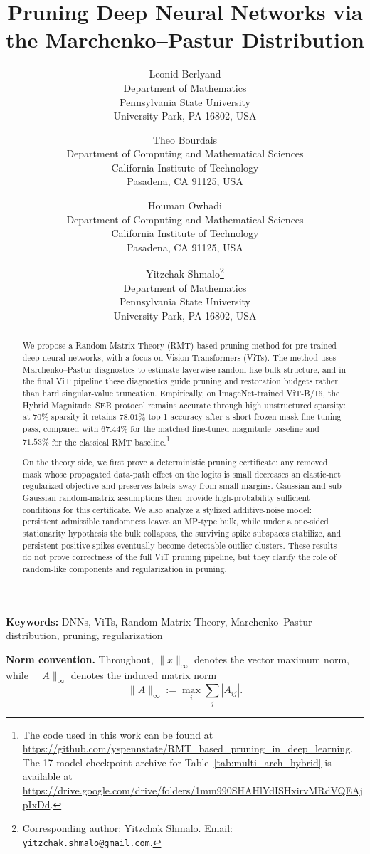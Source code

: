 \documentclass[11pt]{article}
\title{\textbf{Pruning Deep Neural Networks via the Marchenko--Pastur Distribution}}
\author{
    Leonid Berlyand \\
    {\small Department of Mathematics} \\
    {\small Pennsylvania State University} \\
    {\small University Park, PA 16802, USA}
    \and
    Theo Bourdais\\
    {\small Department of Computing and Mathematical Sciences} \\
    {\small California Institute of Technology} \\
    {\small Pasadena, CA 91125, USA}
    \and
    Houman Owhadi\\
    {\small Department of Computing and Mathematical Sciences} \\
    {\small California Institute of Technology} \\
    {\small Pasadena, CA 91125, USA}
    \and
    Yitzchak Shmalo\thanks{Corresponding author: Yitzchak Shmalo. Email: \texttt{yitzchak.shmalo@gmail.com}.} \\
    {\small Department of Mathematics} \\
    {\small Pennsylvania State University} \\
    {\small University Park, PA 16802, USA}
}
\date{}
\theoremstyle{plain}
\theoremstyle{definition}
\theoremstyle{remark}
\newcommand{\1}{\mathbf{1}}
\begin{document}
\maketitle

\begin{abstract}
We propose a Random Matrix Theory (RMT)-based pruning method for pre-trained deep neural networks, with a focus on Vision Transformers (ViTs). The method uses Marchenko--Pastur diagnostics to estimate layerwise random-like bulk structure, and in the final ViT pipeline these diagnostics guide pruning and restoration budgets rather than hard singular-value truncation. Empirically, on ImageNet-trained ViT-B/16, the Hybrid Magnitude--SER protocol remains accurate through high unstructured sparsity: at \(70\%\) sparsity it retains \(78.01\%\) top-1 accuracy after a short frozen-mask fine-tuning pass, compared with \(67.44\%\) for the matched fine-tuned magnitude baseline and \(71.53\%\) for the classical RMT baseline.\footnote{The code used in this work can be found at \url{https://github.com/yspennstate/RMT_based_pruning_in_deep_learning}. The 17-model checkpoint archive for Table~\ref{tab:multi_arch_hybrid} is available at \url{https://drive.google.com/drive/folders/1mm990SHAHlYdISHxirvMRdVQEAjpIxDd}.}

On the theory side, we first prove a deterministic pruning certificate: any removed mask whose propagated data-path effect on the logits is small decreases an elastic-net regularized objective and preserves labels away from small margins. Gaussian and sub-Gaussian random-matrix assumptions then provide high-probability sufficient conditions for this certificate. We also analyze a stylized additive-noise model: persistent admissible randomness leaves an MP-type bulk, while under a one-sided stationarity hypothesis the bulk collapses, the surviving spike subspaces stabilize, and persistent positive spikes eventually become detectable outlier clusters. These results do not prove correctness of the full ViT pruning pipeline, but they clarify the role of random-like components and regularization in pruning.
\end{abstract}

\noindent\textbf{Keywords:} DNNs, ViTs, Random Matrix Theory, Marchenko--Pastur distribution, pruning, regularization

\noindent\textbf{Norm convention.}
Throughout, \(\|x\|_\infty\) denotes the vector maximum norm, while \(\|A\|_\infty\) denotes the induced matrix norm
\[
\|A\|_\infty:=\max_i\sum_j |A_{ij}|.
\]
\end{document}
